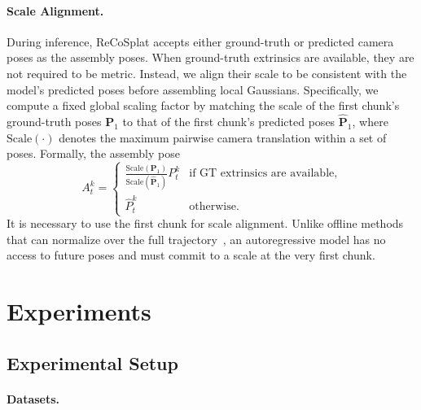 \documentclass[runningheads]{llncs}
\begin{document}
\vspace{-2mm} \paragraph{\textbf{Scale Alignment.}}
During inference, ReCoSplat accepts either ground-truth or predicted camera poses as the assembly poses.
When ground-truth extrinsics are available, they are not required to be metric. Instead, we align their scale to be consistent with the model’s predicted poses before assembling local Gaussians.
Specifically, we compute a fixed global scaling factor by matching the scale of the first chunk's ground-truth poses $\mathbf{P}_1$ to that of the first chunk's predicted poses $\hat{\mathbf{P}}_1$, where $\text{Scale}(\cdot)$ denotes the maximum pairwise camera translation within a set of poses. 
Formally, the assembly pose
\begin{equation}
    A_t^k
    =
    \begin{cases}
        \frac{\text{Scale}(\mathbf{P}_1)}{\text{Scale}(\hat{\mathbf{P}}_1)}P_t^k & \text{if GT extrinsics are available,} \\
        \hat{P}_t^k & \text{otherwise.}
    \end{cases}
\end{equation}
It is necessary to use the first chunk for scale alignment.
Unlike offline methods that can normalize over the full trajectory~\cite{ye2025yonosplatneedmodelfeedforward}, an autoregressive model has no access to future poses and must commit to a scale at the very first chunk.

\section{Experiments}

\subsection{Experimental Setup}

\vspace{-2mm} \paragraph{\textbf{Datasets}.}
\end{document}

